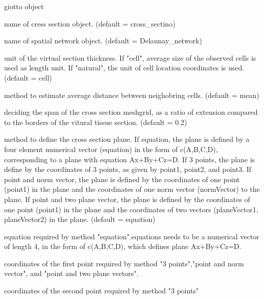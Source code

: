 \documentclass[a4paper]{book}
\begin{document}
%
\begin{Arguments}
\begin{ldescription}
\item[\code{gobject}] giotto object

\item[\code{name}] name of cress section object. (default = cross\_sectino)

\item[\code{spatial\_network\_name}] name of spatial network object. (default = Delaunay\_network)

\item[\code{thickness\_unit}] unit of the virtual section thickness. If "cell", average size of the observed cells is used as length unit. If "natural", the unit of cell location coordinates is used.(default = cell)

\item[\code{cell\_distance\_estimate\_method}] method to estimate average distance between neighobring cells. (default = mean)

\item[\code{extend\_ratio}] deciding the span of the cross section meshgrid, as a ratio of extension compared to the borders of the vitural tissue section. (default = 0.2)

\item[\code{method}] method to define the cross section plane.
If equation, the plane is defined by a four element numerical vector (equation) in the form of c(A,B,C,D), corresponding to a plane with equation Ax+By+Cz=D.
If 3 points, the plane is define by the coordinates of 3 points, as given by point1, point2, and point3.
If point and norm vector, the plane is defined by the coordinates of one point (point1) in the plane and the coordinates of one norm vector (normVector) to the plane.
If point and two plane vector, the plane is defined by the coordinates of one point (point1) in the plane and the coordinates of two vectors (planeVector1, planeVector2) in the plane.
(default = equation)

\item[\code{equation}] equation required by method "equation".equations needs to be a numerical vector of length 4, in the form of c(A,B,C,D), which defines plane Ax+By+Cz=D.

\item[\code{point1}] coordinates of the first point required by method "3 points","point and norm vector", and "point and two plane vectors".

\item[\code{point2}] coordinates of the second point required by method "3 points"


\end{ldescription}
\end{Arguments}
\end{document}
